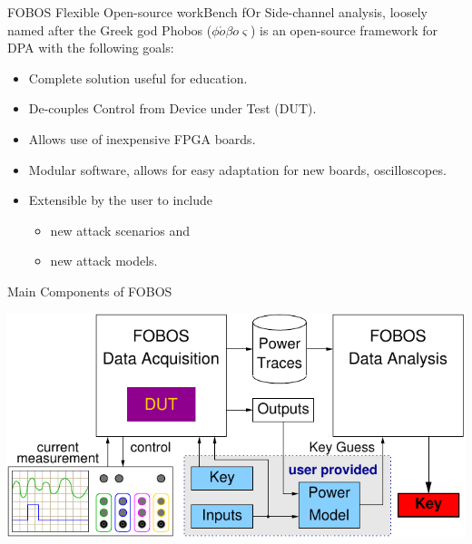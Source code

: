 \documentclass[xcolor=pdftex,dvipsnames,table,final]{beamer}
\begin{document}
\begin{frame}[fragile]{}
\begin{columns}[t]
\begin{column}{.31\linewidth}
      \begin{block}{FOBOS}
        {\color{red}F}lexible {\color{red}O}pen-source work{\color{red}B}ench 
        f{\color{red}O}r {\color{red}S}ide-channel analysis, 
          loosely named after the Greek god Phobos ($\phi \acute{o} \beta o \varsigma$) is 
          an open-source framework for DPA with the following goals: 
        \begin{itemize}
          \item Complete solution useful for education.
          \item De-couples Control from Device under Test (DUT).
          \item Allows use of inexpensive FPGA boards.
          \item Modular software, allows for easy adaptation for new boards, oscilloscopes.
          \item Extensible by the user to include
          \begin{itemize}
            \item new attack scenarios and
            \item new attack models. 
          \end{itemize}
        \end{itemize}
      \end{block}
      \begin{block}{Main Components of FOBOS}
        \begin{center}
          \includegraphics[scale=1.6]{../figures/fobos-top}
        \end{center} 
      \end{block}
     

\end{column}
\end{columns}
\end{frame}
\end{document}
